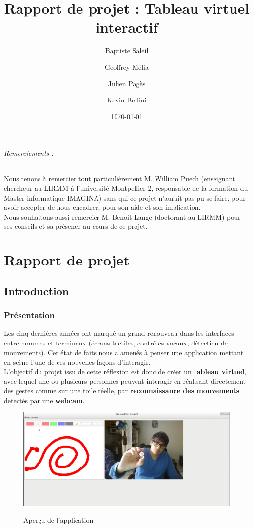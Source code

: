 \documentclass{report}
\title{Rapport de projet : Tableau virtuel interactif}
\author{Baptiste Saleil \and Geoffrey Mélia \and Julien Pagès \and Kevin Bollini}
\date{\today}
\begin{document}
	\maketitle
	\thispagestyle{empty}
	\newpage
	
	\tableofcontents

	\listoffigures
	
	\newpage
	\paragraph{Remerciements :}
	Nous tenons à remercier tout particulièrement M. William Puech (enseignant chercheur au LIRMM à l'université Montpellier 2, responsable de la formation du Master informatique IMAGINA) sans qui ce projet n'aurait pas pu se faire, pour avoir accepter de nous encadrer, pour son aide et son implication.\\
	Nous souhaitons aussi remercier M. Benoit Lange (doctorant au LIRMM) pour ses conseils et sa présence au cours de ce projet.
	\part{Rapport de projet}
	\newpage
	\chapter{Introduction}
		\section{Présentation}		
		Les cinq dernières années ont marqué un grand renouveau dans les interfaces entre hommes et terminaux (écrans tactiles, contrôles vocaux, détection de mouvements). Cet état de faits nous a amenés à penser une application mettant en scène l'une de ces nouvelles façons d'interagir.\\

		 L'objectif du projet issu de cette réflexion est donc de créer un \textbf{tableau virtuel}, avec lequel une ou plusieurs personnes peuvent interagir en réalisant directement des gestes comme sur une toile réelle, par \textbf{reconnaissance des mouvements} detectés par une \textbf{webcam}. \\
		\begin{figure}[!h]
			\centering
			\includegraphics[scale=0.3]{../images/capture-intro.png}\\
			\caption{Aperçu de l'application}
			\label{Aperçu de l'application}
		\end{figure}
	\newpage
\end{document}

